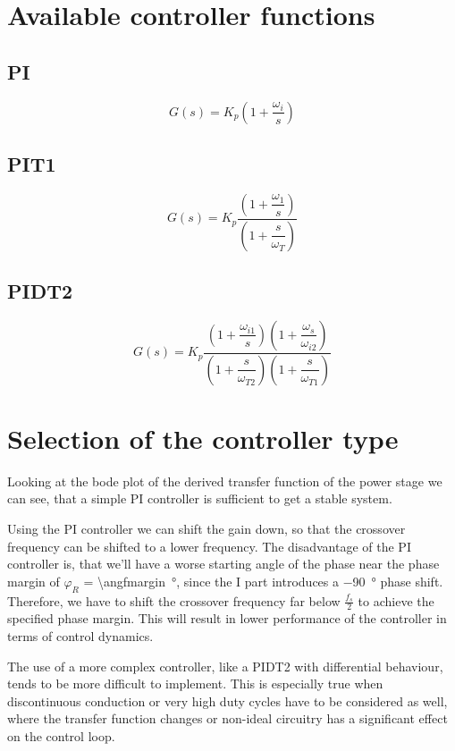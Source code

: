 
\section{Available controller functions}

\subsection{PI}
\[
	G(s)
	= K_p \left(1 + \dfrac{\omega_i}{s} \right)
\]

\subsection{PIT1}
\[
	G(s)
	= K_p \dfrac{
		\left(1 + \dfrac{\omega_{1}}{s}\right)
	}{ 
		\left(1 + \dfrac{s}{\omega_{T}} \right)
	}
\]
\subsection{PIDT2}

\[
	G(s)
	= K_p \dfrac{
		\left(1 + \dfrac{\omega_{i1}}{s}\right) \left(1 + \dfrac{\omega_{s}}{\omega_{i2}}\right)
	}{ 
		\left(1 + \dfrac{s}{\omega_{T2}} \right) \left(1 + \dfrac{s}{\omega_{T1}} \right)
	}
\]

\section{Selection of the controller type}
Looking at the bode plot of the derived transfer function of the power stage
we can see, that a simple PI controller is sufficient to get a stable system.

Using the PI controller we can shift the gain down, so that the crossover
frequency can be shifted to a lower frequency. The disadvantage of the PI
controller is, that we'll have a worse starting angle of the phase near the
phase margin of $\varphi_R$ = \SI{\angfmargin}{\degree}, since the I part
introduces a \SI{-90}{\degree} phase shift. Therefore, we have to shift the
crossover frequency far below $\frac{f_s}{2}$ to achieve the specified
phase margin. This will result in lower performance of the controller in terms
of control dynamics.

The use of a more complex controller, like a PIDT2 with differential behaviour,
tends to be more difficult to implement. This is especially true when 
discontinuous conduction or very high duty cycles have to be considered as well,
where the transfer function changes or non-ideal circuitry has a significant
effect on the control loop.

